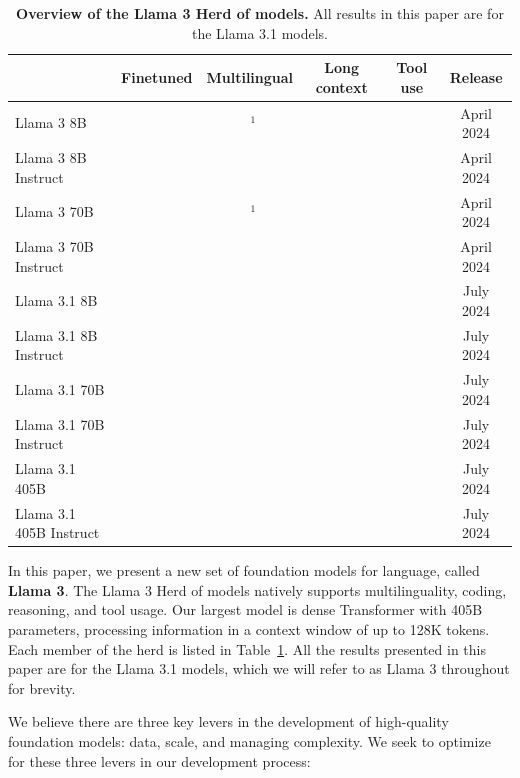 \documentclass[dvipsnames]{fairmeta}
\newcommand{\cmark}{\textcolor{ForestGreen}{\ding{51}}}
\newcommand{\xmark}{\textcolor{red}{\ding{55}}}
\begin{document}
\begin{table}[t]
	\centering
	\begin{tabular}{l|ccccc}
	\toprule
	& \textbf{Finetuned}  & \textbf{Multilingual} & \textbf{Long context} & \textbf{Tool use} & \textbf{Release}\\
	\midrule
	Llama 3 8B  & \xmark & ~\xmark$^\textrm{1}$ & \xmark & \xmark & April 2024  \\
	Llama 3 8B Instruct & \cmark & \xmark &  \xmark & \xmark & April 2024  \\
	Llama 3 70B  & \xmark & ~\xmark$^\textrm{1}$ & \xmark & \xmark & April 2024  \\
	Llama 3 70B Instruct & \cmark & \xmark & \xmark & \xmark & April 2024  \\
	Llama 3.1 8B  & \xmark & \cmark & \cmark & \xmark & July 2024  \\
	Llama 3.1 8B Instruct & \cmark & \cmark & \cmark & \cmark & July 2024  \\
	Llama 3.1 70B  & \xmark & \cmark & \cmark & \xmark & July 2024  \\
	Llama 3.1 70B Instruct & \cmark & \cmark & \cmark & \cmark & July 2024  \\
	Llama 3.1 405B  & \xmark & \cmark & \cmark & \xmark & July 2024  \\
	Llama 3.1 405B Instruct & \cmark & \cmark & \cmark & \cmark & July 2024  \\
	\bottomrule
	\end{tabular}
		\caption{\textbf{Overview of the Llama 3 Herd of models.} All results in this paper are for the Llama 3.1 models.}
	\label{table:family_of_models}
\end{table}

In this paper, we present a new set of foundation models for language, called \textbf{Llama 3}. 
The Llama 3 Herd of models natively supports multilinguality, coding, reasoning, and tool usage.
Our largest model is dense Transformer with 405B parameters, processing information in a context window of up to 128K tokens.
Each member of the herd is listed in Table~\ref{table:family_of_models}.
All the results presented in this paper are for the Llama 3.1 models, which we will refer to as Llama 3 throughout for brevity.

We believe there are three key levers in the development of high-quality foundation models: data, scale, and managing complexity. 
We seek to optimize for these three levers in our development process:
\end{document}
